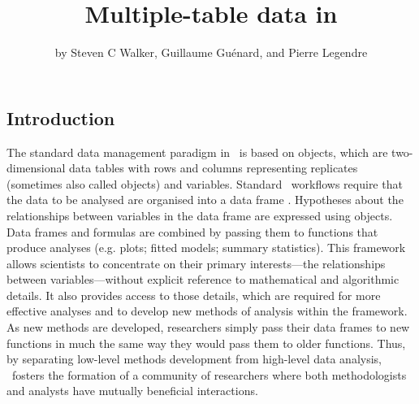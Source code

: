 \documentclass[a4paper]{report}
\begin{document}
\begin{article}
\title{Multiple-table data in \R}
\author{by Steven C Walker, Guillaume Gu\'{e}nard, and Pierre Legendre}
\maketitle

 





\section{Introduction}

The standard data management paradigm in \R\ is based on  objects, which are two-dimensional data tables with rows and columns representing replicates (sometimes also called objects) and variables.  Standard \R\ workflows require that the data to be analysed are organised into a data frame \citep{ChambersAndHastie1992}.  Hypotheses about the relationships between variables in the data frame are expressed using  objects.  Data frames and formulas are combined by passing them to functions that produce analyses (e.g. plots; fitted models; summary statistics).  This framework allows scientists to concentrate on their primary interests---the relationships between variables---without explicit reference to mathematical and algorithmic details.  It also provides access to those details, which are required for more effective analyses and to develop new methods of analysis within the framework.  As new methods are developed, researchers simply pass their data frames to new functions in much the same way they would pass them to older functions.  Thus, by separating low-level methods development from high-level data analysis, \R\ fosters the formation of a community of researchers where both methodologists and analysts have mutually beneficial interactions.


\end{article}
\end{document}
